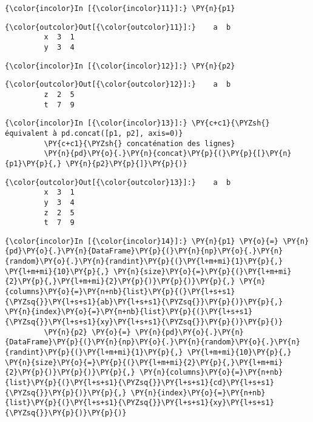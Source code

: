     \begin{Verbatim}[commandchars=\\\{\}]
{\color{incolor}In [{\color{incolor}11}]:} \PY{n}{p1}
\end{Verbatim}


\begin{Verbatim}[commandchars=\\\{\}]
{\color{outcolor}Out[{\color{outcolor}11}]:}    a  b
         x  3  1
         y  3  4
\end{Verbatim}
            
    \begin{Verbatim}[commandchars=\\\{\}]
{\color{incolor}In [{\color{incolor}12}]:} \PY{n}{p2}
\end{Verbatim}


\begin{Verbatim}[commandchars=\\\{\}]
{\color{outcolor}Out[{\color{outcolor}12}]:}    a  b
         z  2  5
         t  7  9
\end{Verbatim}
            
    \begin{Verbatim}[commandchars=\\\{\}]
{\color{incolor}In [{\color{incolor}13}]:} \PY{c+c1}{\PYZsh{} équivalent à pd.concat([p1, p2], axis=0)}
         \PY{c+c1}{\PYZsh{} concaténation des lignes}
         \PY{n}{pd}\PY{o}{.}\PY{n}{concat}\PY{p}{(}\PY{p}{[}\PY{n}{p1}\PY{p}{,} \PY{n}{p2}\PY{p}{]}\PY{p}{)}
\end{Verbatim}


\begin{Verbatim}[commandchars=\\\{\}]
{\color{outcolor}Out[{\color{outcolor}13}]:}    a  b
         x  3  1
         y  3  4
         z  2  5
         t  7  9
\end{Verbatim}
            
    \begin{Verbatim}[commandchars=\\\{\}]
{\color{incolor}In [{\color{incolor}14}]:} \PY{n}{p1} \PY{o}{=} \PY{n}{pd}\PY{o}{.}\PY{n}{DataFrame}\PY{p}{(}\PY{n}{np}\PY{o}{.}\PY{n}{random}\PY{o}{.}\PY{n}{randint}\PY{p}{(}\PY{l+m+mi}{1}\PY{p}{,} \PY{l+m+mi}{10}\PY{p}{,} \PY{n}{size}\PY{o}{=}\PY{p}{(}\PY{l+m+mi}{2}\PY{p}{,}\PY{l+m+mi}{2}\PY{p}{)}\PY{p}{)}\PY{p}{,} \PY{n}{columns}\PY{o}{=}\PY{n+nb}{list}\PY{p}{(}\PY{l+s+s1}{\PYZsq{}}\PY{l+s+s1}{ab}\PY{l+s+s1}{\PYZsq{}}\PY{p}{)}\PY{p}{,} \PY{n}{index}\PY{o}{=}\PY{n+nb}{list}\PY{p}{(}\PY{l+s+s1}{\PYZsq{}}\PY{l+s+s1}{xy}\PY{l+s+s1}{\PYZsq{}}\PY{p}{)}\PY{p}{)}
         \PY{n}{p2} \PY{o}{=} \PY{n}{pd}\PY{o}{.}\PY{n}{DataFrame}\PY{p}{(}\PY{n}{np}\PY{o}{.}\PY{n}{random}\PY{o}{.}\PY{n}{randint}\PY{p}{(}\PY{l+m+mi}{1}\PY{p}{,} \PY{l+m+mi}{10}\PY{p}{,} \PY{n}{size}\PY{o}{=}\PY{p}{(}\PY{l+m+mi}{2}\PY{p}{,}\PY{l+m+mi}{2}\PY{p}{)}\PY{p}{)}\PY{p}{,} \PY{n}{columns}\PY{o}{=}\PY{n+nb}{list}\PY{p}{(}\PY{l+s+s1}{\PYZsq{}}\PY{l+s+s1}{cd}\PY{l+s+s1}{\PYZsq{}}\PY{p}{)}\PY{p}{,} \PY{n}{index}\PY{o}{=}\PY{n+nb}{list}\PY{p}{(}\PY{l+s+s1}{\PYZsq{}}\PY{l+s+s1}{xy}\PY{l+s+s1}{\PYZsq{}}\PY{p}{)}\PY{p}{)}
\end{Verbatim}


